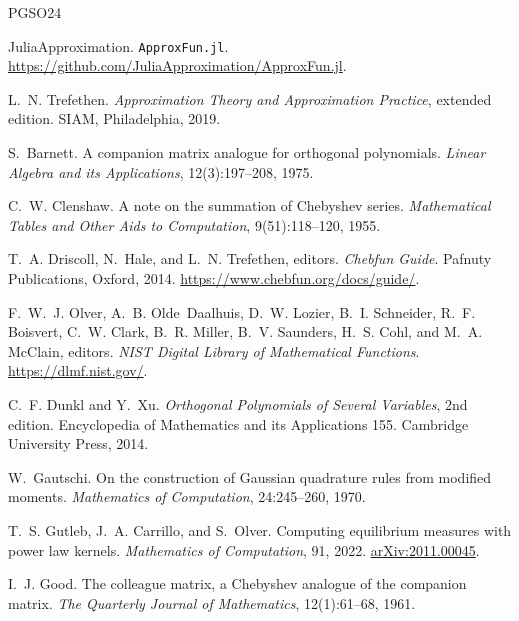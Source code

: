 \begin{thebibliography}{PGSO24}

JuliaApproximation.
\newblock \texttt{ApproxFun.jl}.
\newblock \url{https://github.com/JuliaApproximation/ApproxFun.jl}.

L.~N. Trefethen.
\newblock \emph{Approximation Theory and Approximation Practice}, extended
  edition.
\newblock SIAM, Philadelphia, 2019.

S.~Barnett.
\newblock A companion matrix analogue for orthogonal polynomials.
\newblock \emph{Linear Algebra and its Applications}, 12(3):197--208, 1975.

C.~W. Clenshaw.
\newblock A note on the summation of {C}hebyshev series.
\newblock \emph{Mathematical Tables and Other Aids to Computation},
  9(51):118--120, 1955.

T.~A. Driscoll, N.~Hale, and L.~N. Trefethen, editors.
\newblock \emph{Chebfun Guide}.
\newblock Pafnuty Publications, Oxford, 2014.
\newblock \url{https://www.chebfun.org/docs/guide/}.

F.~W.~J. Olver, A.~B. Olde~Daalhuis, D.~W. Lozier, B.~I. Schneider,
  R.~F. Boisvert, C.~W. Clark, B.~R. Miller, B.~V. Saunders, H.~S. Cohl, and
  M.~A. McClain, editors.
\newblock \emph{NIST Digital Library of Mathematical Functions}.
\newblock \url{https://dlmf.nist.gov/}.

C.~F. Dunkl and Y.~Xu.
\newblock \emph{Orthogonal Polynomials of Several Variables}, 2nd edition.
\newblock Encyclopedia of Mathematics and its Applications 155. Cambridge
  University Press, 2014.

W.~Gautschi.
\newblock On the construction of {G}aussian quadrature rules from modified
  moments.
\newblock \emph{Mathematics of Computation}, 24:245--260, 1970.

T.~S. Gutleb, J.~A. Carrillo, and S.~Olver.
\newblock Computing equilibrium measures with power law kernels.
\newblock \emph{Mathematics of Computation}, 91, 2022.
\newblock \href{https://arxiv.org/abs/2011.00045}{arXiv:2011.00045}.

I.~J. Good.
\newblock The colleague matrix, a {C}hebyshev analogue of the companion matrix.
\newblock \emph{The Quarterly Journal of Mathematics}, 12(1):61--68, 1961.


\end{thebibliography}
